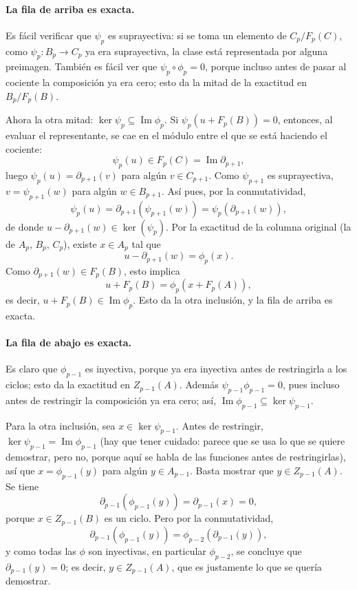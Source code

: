 \documentclass[11pt]{article}
\begin{document}
\paragraph{La fila de arriba es exacta.} Es fácil verificar que $\psi_p$ es suprayectiva: si se toma un elemento de $C_p/F_p(C)$, como $\psi_p\colon B_p\to C_p$ ya era suprayectiva, la clase está representada por alguna preimagen. También es fácil ver que $\psi_p\circ\phi_p=0$, porque incluso antes de pasar al cociente la composición ya era cero; esto da la mitad de la exactitud en $B_p/F_p(B)$.

Ahora la otra mitad: $\ker\psi_p\subseteq\operatorname{Im}\phi_p$. Si $\psi_p(u+F_p(B))=0$, entonces, al evaluar el representante, se cae en el módulo entre el que se está haciendo el cociente:
\[
  \psi_p(u)\in F_p(C)=\operatorname{Im}\partial_{p+1},
\]
luego $\psi_p(u)=\partial_{p+1}(v)$ para algún $v\in C_{p+1}$. Como $\psi_{p+1}$ es suprayectiva, $v=\psi_{p+1}(w)$ para algún $w\in B_{p+1}$. Así pues, por la conmutatividad,
\[
  \psi_p(u)=\partial_{p+1}(\psi_{p+1}(w))=\psi_p(\partial_{p+1}(w)),
\]
de donde $u-\partial_{p+1}(w)\in\ker(\psi_p)$. Por la exactitud de la columna original (la de $A_p$, $B_p$, $C_p$), existe $x\in A_p$ tal que
\[
  u-\partial_{p+1}(w)=\phi_p(x).
\]
Como $\partial_{p+1}(w)\in F_p(B)$, esto implica
\[
  u+F_p(B)=\phi_p(x+F_p(A)),
\]
es decir, $u+F_p(B)\in\operatorname{Im}\phi_p$. Esto da la otra inclusión, y la fila de arriba es exacta.

\paragraph{La fila de abajo es exacta.} Es claro que $\phi_{p-1}$ es inyectiva, porque ya era inyectiva antes de restringirla a los ciclos; esto da la exactitud en $Z_{p-1}(A)$. Además $\psi_{p-1}\phi_{p-1}=0$, pues incluso antes de restringir la composición ya era cero; así, $\operatorname{Im}\phi_{p-1}\subseteq\ker\psi_{p-1}$.

Para la otra inclusión, sea $x\in\ker\psi_{p-1}$. Antes de restringir, $\ker\psi_{p-1}=\operatorname{Im}\phi_{p-1}$ (hay que tener cuidado: parece que se usa lo que se quiere demostrar, pero no, porque aquí se habla de las funciones antes de restringirlas), así que $x=\phi_{p-1}(y)$ para algún $y\in A_{p-1}$. Basta mostrar que $y\in Z_{p-1}(A)$. Se tiene
\[
  \partial_{p-1}(\phi_{p-1}(y))=\partial_{p-1}(x)=0,
\]
porque $x\in Z_{p-1}(B)$ es un ciclo. Pero por la conmutatividad,
\[
  \partial_{p-1}(\phi_{p-1}(y))=\phi_{p-2}(\partial_{p-1}(y)),
\]
y como todas las $\phi$ son inyectivas, en particular $\phi_{p-2}$, se concluye que $\partial_{p-1}(y)=0$; es decir, $y\in Z_{p-1}(A)$, que es justamente lo que se quería demostrar.
\end{document}
